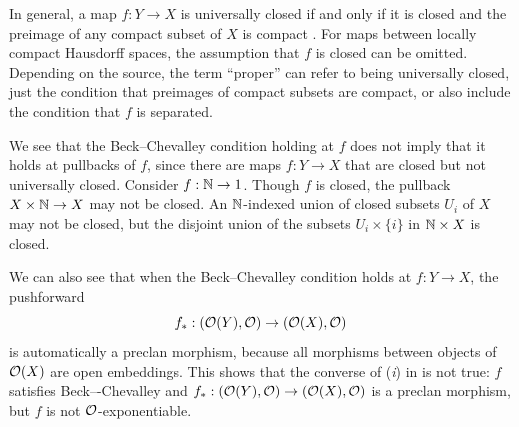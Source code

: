 \begin{example}
  In general, a map $f : Y \to X$ is universally closed
  if and only if it is closed and the preimage of any compact subset of $X$ is compact
  \cite[Theorem 055R]{stacks-project}.
  For maps between locally compact Hausdorff spaces,
  the assumption that $f$ is closed can be omitted.
  Depending on the source, the term ``proper'' can refer to being universally closed,
  just the condition that preimages of compact subsets are compact,
  or also include the condition that $f$ is separated.

  We see that the Beck--Chevalley condition holding at $f$
  does not imply that it holds at pullbacks of $f$,
  since there are maps $f : Y \to X$ that are closed but not universally closed.
  Consider $f : \mathbb{N} \to 1$.
  Though $f$ is closed, the pullback $X \times \mathbb{N} \to X$ may not be closed.
  An $\mathbb{N}$-indexed union of closed subsets $U_i$ of $X$ may not be closed,
  but the disjoint union of the subsets $U_i \times \{i\}$ in $\mathbb{N} \times X$ is closed.
  
  We can also see that when the Beck--Chevalley condition holds at $f : Y \to X$,
  the pushforward
  \[f_* : (\mathcal{O}(Y), \mathcal{O}) \to (\mathcal{O}(X), \mathcal{O})\]
  is automatically a preclan morphism,
  because all morphisms between objects of $\mathcal{O}(X)$ are open embeddings.
  This shows that the converse of (\textit{i}) in 
  is not true:
  $f$ satisfies Beck–-Chevalley and $f_* : (\mathcal{O}(Y), \mathcal{O}) \to (\mathcal{O}(X), \mathcal{O})$
  is a preclan morphism, but $f$ is not $\mathcal{O}$-exponentiable.
\end{example}

